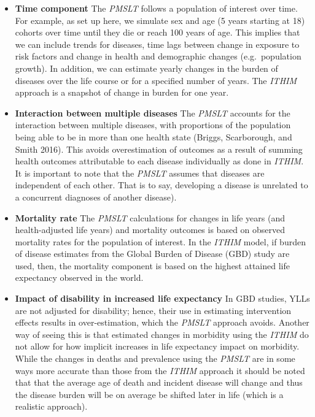 \documentclass[]{article}
\begin{document}
\begin{itemize}
\item
  \textbf{Time component} The \emph{PMSLT} follows a population of
  interest over time. For example, as set up here, we simulate sex and
  age (5 years starting at 18) cohorts over time until they die or reach
  100 years of age. This implies that we can include trends for
  diseases, time lags between change in exposure to risk factors and
  change in health and demographic changes (e.g.~population growth). In
  addition, we can estimate yearly changes in the burden of diseases
  over the life course or for a specified number of years. The
  \emph{ITHIM} approach is a snapshot of change in burden for one year.
\item
  \textbf{Interaction between multiple diseases} The \emph{PMSLT}
  accounts for the interaction between multiple diseases, with
  proportions of the population being able to be in more than one health
  state (Briggs, Scarborough, and Smith 2016). This avoids
  overestimation of outcomes as a result of summing health outcomes
  attributable to each disease individually as done in \emph{ITHIM}. It
  is important to note that the \emph{PMSLT} assumes that diseases are
  independent of each other. That is to say, developing a disease is
  unrelated to a concurrent diagnoses of another disease).
\item
  \textbf{Mortality rate} The \emph{PMSLT} calculations for changes in
  life years (and health-adjusted life years) and mortality outcomes is
  based on observed mortality rates for the population of interest. In
  the \emph{ITHIM} model, if burden of disease estimates from the Global
  Burden of Disease (GBD) study are used, then, the mortality component
  is based on the highest attained life expectancy observed in the
  world.
\item
  \textbf{Impact of disability in increased life expectancy} In GBD
  studies, YLLs are not adjusted for disability; hence, their use in
  estimating intervention effects results in over-estimation, which the
  \emph{PMSLT} approach avoids. Another way of seeing this is that
  estimated changes in morbidity using the \emph{ITHIM} do not allow for
  how implicit increases in life expectancy impact on morbidity. While
  the changes in deaths and prevalence using the \emph{PMSLT} are in
  some ways more accurate than those from the \emph{ITHIM} approach it
  should be noted that that the average age of death and incident
  disease will change and thus the disease burden will be on average be
  shifted later in life (which is a realistic approach).
\end{itemize}
\end{document}
